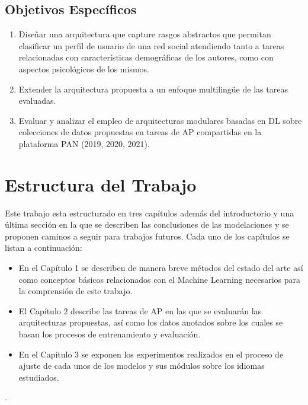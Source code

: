 \subsection*{Objetivos Específicos}
\begin{enumerate}
	\item Diseñar una arquitectura que capture rasgos abstractos que permitan clasificar un perfil de usuario de una red social atendiendo tanto a tareas relacionadas con características demográficas de los autores, como con aspectos psicológicos de los mismos.
	\item Extender la arquitectura propuesta a un enfoque multilingüe de las tareas evaluadas.
	\item Evaluar y analizar el empleo de arquitecturas modulares basadas en DL sobre colecciones de datos propuestas en tareas de AP compartidas en la plataforma PAN (2019, 2020, 2021).
\end{enumerate}
\section*{Estructura del Trabajo}
Este trabajo esta estructurado en tres capítulos además del introductorio y una última sección en la que se describen las conclusiones de las modelaciones y se proponen  caminos a seguir para trabajos futuros. Cada uno de los capítulos se listan a continuación: 

\begin{itemize}
	\item En el Capítulo 1 se describen de manera breve métodos del estado del arte así como conceptos básicos relacionados con el Machine Learning necesarios para la comprensión de este trabajo.
	\item El Capítulo 2 describe las tareas de AP en las que se evaluarán las arquitecturas propuestas, así como los datos anotados sobre los cuales se basan los procesos de entrenamiento y evaluación.
	\item En el Capítulo 3 se exponen los experimentos realizados en el proceso de ajuste de cada unos de los modelos y sus módulos sobre los idiomas estudiados. 
\end{itemize}
. 
